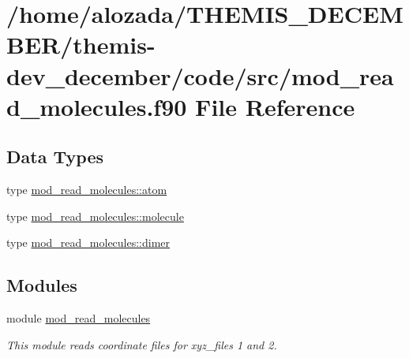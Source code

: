 \hypertarget{mod__read__molecules_8f90}{}\section{/home/alozada/\+T\+H\+E\+M\+I\+S\+\_\+\+D\+E\+C\+E\+M\+B\+E\+R/themis-\/dev\+\_\+december/code/src/mod\+\_\+read\+\_\+molecules.f90 File Reference}
\label{mod__read__molecules_8f90}
\subsection*{Data Types}
\begin{DoxyCompactItemize}
\item 
type \hyperlink{structmod__read__molecules_1_1atom}{mod\+\_\+read\+\_\+molecules\+::atom}
\item 
type \hyperlink{structmod__read__molecules_1_1molecule}{mod\+\_\+read\+\_\+molecules\+::molecule}
\item 
type \hyperlink{structmod__read__molecules_1_1dimer}{mod\+\_\+read\+\_\+molecules\+::dimer}
\end{DoxyCompactItemize}
\subsection*{Modules}
\begin{DoxyCompactItemize}
\item 
module \hyperlink{namespacemod__read__molecules}{mod\+\_\+read\+\_\+molecules}
\begin{DoxyCompactList}\small\item\em This module reads coordinate files for xyz\+\_\+files 1 and 2. \end{DoxyCompactList}\end{DoxyCompactItemize}
